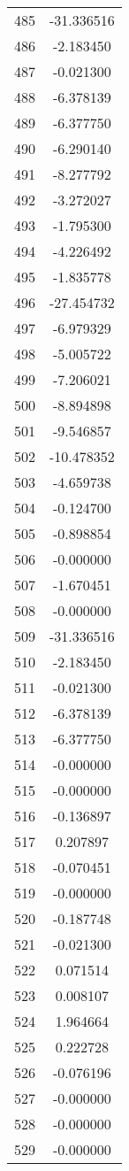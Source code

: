 \documentclass[12pt]{article}
\begin{document}
\begin{longtable}{@{}cc@{}}
485 & -31.336516 \\
486 & -2.183450 \\
487 & -0.021300 \\
488 & -6.378139 \\
489 & -6.377750 \\
490 & -6.290140 \\
491 & -8.277792 \\
492 & -3.272027 \\
493 & -1.795300 \\
494 & -4.226492 \\
495 & -1.835778 \\
496 & -27.454732 \\
497 & -6.979329 \\
498 & -5.005722 \\
499 & -7.206021 \\
500 & -8.894898 \\
501 & -9.546857 \\
502 & -10.478352 \\
503 & -4.659738 \\
504 & -0.124700 \\
505 & -0.898854 \\
506 & -0.000000 \\
507 & -1.670451 \\
508 & -0.000000 \\
509 & -31.336516 \\
510 & -2.183450 \\
511 & -0.021300 \\
512 & -6.378139 \\
513 & -6.377750 \\
514 & -0.000000 \\
515 & -0.000000 \\
516 & -0.136897 \\
517 & 0.207897 \\
518 & -0.070451 \\
519 & -0.000000 \\
520 & -0.187748 \\
521 & -0.021300 \\
522 & 0.071514 \\
523 & 0.008107 \\
524 & 1.964664 \\
525 & 0.222728 \\
526 & -0.076196 \\
527 & -0.000000 \\
528 & -0.000000 \\
529 & -0.000000 \\

\end{longtable}
\end{document}
